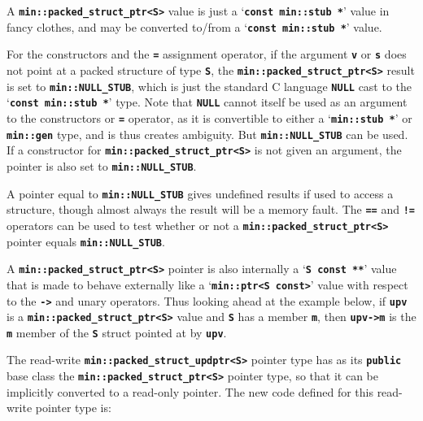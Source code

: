 \documentclass[12pt]{article}
\newcommand{\TT}[1]{{\tt \bfseries #1}}
\newcommand{\EOL}{\penalty \exhyphenpenalty}
\begin{document}
A \TT{min::\EOL packed\_\EOL struct\_\EOL ptr<S>} value is just
a `\TT{const min::stub~*}' value in fancy clothes, and may be
converted to/from a `\TT{const min::stub~*}' value.

For the constructors and the \TT{=} assignment operator, if the
argument \TT{v} or \TT{s} does not point at a packed structure
of type \TT{S}, the \TT{min::\EOL packed\_\EOL struct\_\EOL ptr<S>}
result is set to \TT{min::\EOL NULL\_\EOL STUB},
which is just the standard C language \TT{NULL}
cast to the `\TT{const min::stub *}' type.
Note that \TT{NULL} cannot itself be used as an argument to
the constructors or \TT{=} operator, as it is
convertible to either a `\TT{min::stub *}'
or \TT{min::gen} type, and is thus creates ambiguity.
But \TT{min::\EOL NULL\_\EOL STUB} can be used.
If a constructor for \TT{min::\EOL packed\_\EOL struct\_\EOL ptr<S>}
is not given an argument, the pointer is also set to
\TT{min::\EOL NULL\_\EOL STUB}.

A pointer equal to
\TT{min::\EOL NULL\_\EOL STUB} gives undefined results if
used to access a structure,
though almost always the result will be a memory fault.
The \TT{==} and \TT{!=} operators can be used to test whether
or not a \TT{min::\EOL packed\_\EOL struct\_\EOL ptr<S>} pointer
equals \TT{min::\EOL NULL\_\EOL STUB}.

A \TT{min::\EOL packed\_\EOL struct\_\EOL ptr<S>} pointer is also
internally a `\TT{S const **}' value that is made to behave externally like a
`\TT{min::\EOL ptr<S~const>}' value with respect to the \TT{->} and
unary \TT{*} operators.  Thus looking ahead at the example below,
if \TT{upv} is a
\TT{min::\EOL packed\_\EOL struct\_\EOL ptr<S>} value
and \TT{S} has a member \TT{m}, then \TT{upv->m} is the \TT{m}
member of the \TT{S} struct pointed at by \TT{upv}.

The read-write \TT{min::\EOL packed\_\EOL struct\_\EOL updptr<S>}
pointer type has 
as its \TT{public} base class the
\TT{min::\EOL packed\_\EOL struct\_\EOL ptr<S>} pointer type,
so that it can be implicitly converted to
a read-only pointer.  The new code defined for this read-write
pointer type is:
\end{document}
